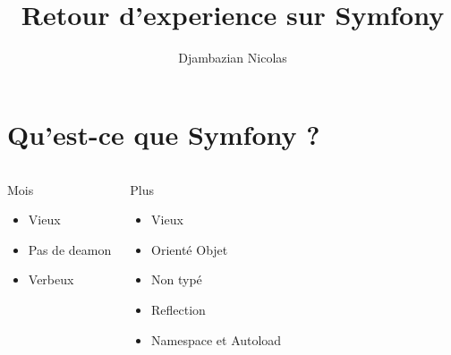 \documentclass[12pt, francais]{beamer}
\title{Retour d'experience sur Symfony}
\date{}
\author{Djambazian Nicolas}
\begin{document}
\maketitle

\section{Qu'est-ce que Symfony ?}

\begin{frame}
	\pause
	\begin{columns}
			\begin{block}{Mois}
				\begin{itemize}
					\centering
					\item  Vieux \\
					\item Pas de deamon \\
					\item Verbeux \\
				\end{itemize}
			\end{block}
		\column[c]{.4\linewidth}
			\begin{block}{Plus}
				\begin{itemize}
					\centering
					\item Vieux \\
					\item Orient\'e Objet \\
					\item Non typ\'e \\
					\item Reflection \\
					\item Namespace et Autoload \\
				\end{itemize}
			\end{block}
	\end{columns}
\end{frame}
\end{document}
